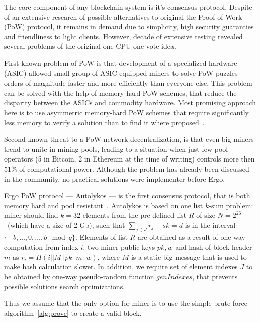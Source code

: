 \documentclass[]{article}
\newcommand{\Ergo}{Ergo}
\begin{document}

    The core component of any blockchain system is it's consensus protocol.
    Despite of an extensive research of possible alternatives to original the Proof-of-Work (PoW) protocol,
    it remains in demand due to simplicity, high security guaranties and friendliness to light clients.
    However, decade of extensive testing revealed several problems of the original one-CPU-one-vote idea.

    First known problem of PoW is that development of a specialized hardware (ASIC) allowed
    small group of ASIC-equipped miners to solve PoW puzzles orders of magnitude faster and more efficiently
    than everyone else. This problem can be solved with the help of memory-hard PoW schemes,
    that reduce the disparity between the ASICs and commodity hardware. Most promising approach here
    is to use asymmetric memory-hard PoW schemes that require significantly less memory
    to verify a solution than to find it where proposed~\cite{biryukov2017equihash,ethHash}.

    Second known threat to a PoW network decentralization, is that even big miners trend to unite in
    mining pools, leading to a situation when just few pool operators (5 in Bitcoin, 2 in Ethereum
    at the time of writing) controls more then 51\% of computational power.
    Although the problem has already been discussed in the community, no practical solutions were
    implementer before \Ergo{}.


    Ergo PoW protocol --- Autolykos --- is the first consensus protocol, that is both memory hard
    and pool resistant~\cite{Ergopow}.
    Autolykos is based on one list $k$-sum problem: miner should find
    $k=32$ elements from the pre-defined list $R$ of size $N=2^{26}$~(which have a size of 2 Gb),
    such that $\sum_{j \in J} r_{j} - sk = d$ is in the interval $\{-b,\dots,0,\dots,b\mod q\}$.
    Elements of list $R$ are obtained as a result of one-way computation from index $i$,
    two miner public keys $pk,w$ and hash of block header $m$ as $r_i=H(i||M||pk||m||w)$,
    where $M$ is a static big message that is used to make hash calculation slower.
    In addition, we require set of element indexes $J$ to be obtained
    by one-way pseudo-random function $genIndexes$, that prevents possible solutions
    search optimizations.

    Thus we assume that the only option for miner is to use the simple brute-force algorithm~\ref{alg:prove} to
    create a valid block.
\end{document}
